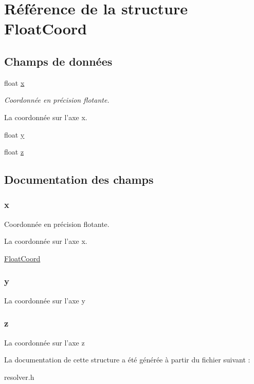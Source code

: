 \hypertarget{struct_float_coord}{\section{Référence de la structure Float\-Coord}
\label{struct_float_coord}
}
\subsection*{Champs de données}
\begin{DoxyCompactItemize}
\item 
float \hyperlink{struct_float_coord_a9336ebf25087d91c818ee6e9ec29f8c1}{x}
\begin{DoxyCompactList}\small\item\em Coordonnée en précision flotante.

La coordonnée sur l'axe x. \end{DoxyCompactList}\item 
float \hyperlink{struct_float_coord_a2fb1c5cf58867b5bbc9a1b145a86f3a0}{y}
\item 
float \hyperlink{struct_float_coord_a25ed1bcb423b0b7200f485fc5ff71c8e}{z}
\end{DoxyCompactItemize}


\subsection{Documentation des champs}
\hypertarget{struct_float_coord_a9336ebf25087d91c818ee6e9ec29f8c1}{
\subsubsection[{x}]{\setlength{\rightskip}{0pt plus 5cm}x}}\label{struct_float_coord_a9336ebf25087d91c818ee6e9ec29f8c1}


Coordonnée en précision flotante.

La coordonnée sur l'axe x. 

\hyperlink{struct_float_coord}{Float\-Coord} \hypertarget{struct_float_coord_a2fb1c5cf58867b5bbc9a1b145a86f3a0}{
\subsubsection[{y}]{\setlength{\rightskip}{0pt plus 5cm}y}}\label{struct_float_coord_a2fb1c5cf58867b5bbc9a1b145a86f3a0}
La coordonnée sur l'axe y \hypertarget{struct_float_coord_a25ed1bcb423b0b7200f485fc5ff71c8e}{
\subsubsection[{z}]{\setlength{\rightskip}{0pt plus 5cm}z}}\label{struct_float_coord_a25ed1bcb423b0b7200f485fc5ff71c8e}
La coordonnée sur l'axe z 

La documentation de cette structure a été générée à partir du fichier suivant \-:\begin{DoxyCompactItemize}
\item 
resolver.\-h\end{DoxyCompactItemize}
